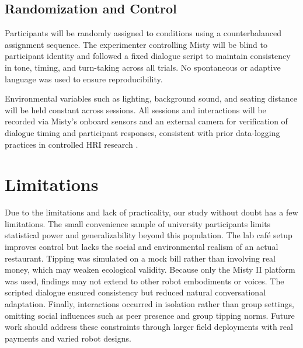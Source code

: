 \documentclass[conference]{IEEEtran}
\begin{document}
\subsection{Randomization and Control}
Participants will be randomly assigned to conditions using a counterbalanced assignment sequence. The experimenter controlling Misty will be blind to participant identity and followed a fixed dialogue script to maintain consistency in tone, timing, and turn-taking across all trials. No spontaneous or adaptive language was used to ensure reproducibility.

Environmental variables such as lighting, background sound, and seating distance will be held constant across sessions. All sessions and interactions will be recorded via Misty's onboard sensors and an external camera for verification of dialogue timing and participant responses, consistent with prior data-logging practices in controlled HRI research \cite{b26}.

\section{Limitations}
\label{sec:limitations}
Due to the limitations and lack of practicality, our study without doubt has a few limitations. The small convenience sample of university participants limits statistical power and generalizability beyond this population. The lab café setup improves control but lacks the social and environmental realism of an actual restaurant. Tipping was simulated on a mock bill rather than involving real money, which may weaken ecological validity. Because only the Misty II platform was used, findings may not extend to other robot embodiments or voices. The scripted dialogue ensured consistency but reduced natural conversational adaptation. Finally, interactions occurred in isolation rather than group settings, omitting social influences such as peer presence and group tipping norms. Future work should address these constraints through larger field deployments with real payments and varied robot designs.
\end{document}
